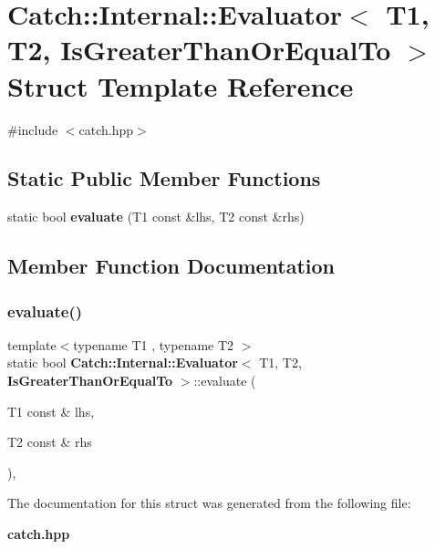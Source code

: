 \section{Catch\+:\+:Internal\+:\+:Evaluator$<$ T1, T2, Is\+Greater\+Than\+Or\+Equal\+To $>$ Struct Template Reference}
\label{struct_catch_1_1_internal_1_1_evaluator_3_01_t1_00_01_t2_00_01_is_greater_than_or_equal_to_01_4}


{\ttfamily \#include $<$catch.\+hpp$>$}

\subsection*{Static Public Member Functions}
\begin{DoxyCompactItemize}
\item 
static bool \textbf{ evaluate} (T1 const \&lhs, T2 const \&rhs)
\end{DoxyCompactItemize}


\subsection{Member Function Documentation}
\mbox{\label{struct_catch_1_1_internal_1_1_evaluator_3_01_t1_00_01_t2_00_01_is_greater_than_or_equal_to_01_4_a5ba107c6da4292b6492a0e5e906f9484}} 
\subsubsection{evaluate()}
{\footnotesize\ttfamily template$<$typename T1 , typename T2 $>$ \\
static bool \textbf{ Catch\+::\+Internal\+::\+Evaluator}$<$ T1, T2, \textbf{ Is\+Greater\+Than\+Or\+Equal\+To} $>$\+::evaluate (\begin{DoxyParamCaption}\item[{T1 const \&}]{lhs,  }\item[{T2 const \&}]{rhs }\end{DoxyParamCaption})\hspace{0.3cm}{\ttfamily [inline]}, {\ttfamily [static]}}



The documentation for this struct was generated from the following file\+:\begin{DoxyCompactItemize}
\item 
\textbf{ catch.\+hpp}\end{DoxyCompactItemize}
